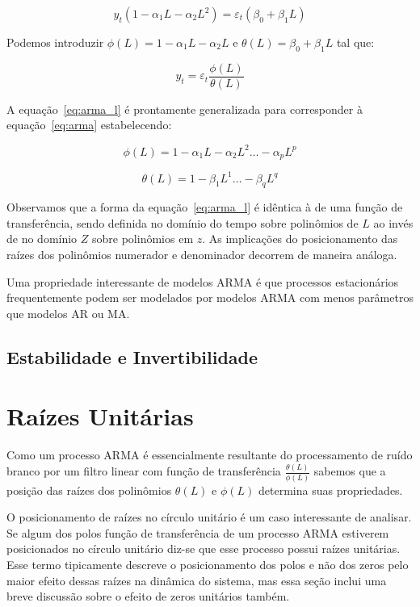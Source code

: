 $$ y_t (1 - \alpha_1 L - \alpha_2 L^2) = \varepsilon_{t} (\beta_0 + \beta_1 L) $$

Podemos introduzir $\phi(L) = 1 - \alpha_1 L - \alpha_2 L$ e $\theta(L) =
\beta_0 + \beta_1 L$ tal que:

\begin{equation}\label{eq:arma_l}
    y_t = \varepsilon_t \frac{\phi(L)}{\theta(L)}
\end{equation}

A equação~\ref{eq:arma_l} é prontamente generalizada para corresponder à
equação~\ref{eq:arma} estabelecendo:

$$\phi(L) = 1 - \alpha_1 L - \alpha_2 L^2 \hdots - \alpha_p L^p$$

$$\theta(L) = 1 - \beta_1 L^1 \hdots - \beta_q L^q$$


Observamos que a forma da equação~\ref{eq:arma_l} é idêntica à de uma função de
transferência, sendo definida no domínio do tempo sobre polinômios de $L$ ao
invés de no domínio $Z$ sobre polinômios em $z$. As implicações do
posicionamento das raízes dos polinômios numerador e denominador decorrem de
maneira análoga.

Uma propriedade interessante de modelos ARMA é que processos estacionários
frequentemente podem ser modelados por modelos ARMA com menos parâmetros que
modelos AR ou MA.

\subsection{Estabilidade e Invertibilidade}
\label{ssec:stability_invertibility}

\section{Raízes Unitárias}
\label{sec:unit_roots}

Como um processo ARMA é essencialmente resultante do processamento de ruído
branco por um filtro linear com função de transferência
$\frac{\theta(L)}{\phi(L)}$ sabemos que a posição das raízes dos polinômios
$\theta(L)$ e $\phi(L)$ determina suas propriedades.

O posicionamento de raízes no círculo unitário é um caso interessante de
analisar. Se algum dos polos função de transferência de um processo ARMA
estiverem posicionados no círculo unitário diz-se que esse processo possui
raízes unitárias. Esse termo tipicamente descreve o posicionamento dos polos e
não dos zeros pelo maior efeito dessas raízes na dinâmica do sistema, mas essa
seção inclui uma breve discussão sobre o efeito de zeros unitários também.

